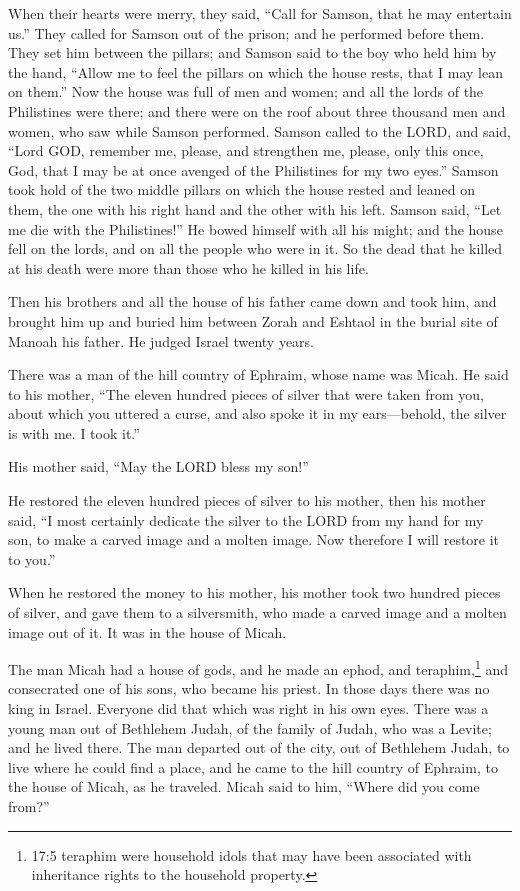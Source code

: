 \myverse{}When their hearts were merry, they said, “Call for Samson, that
he may entertain us.” They called for Samson out of the prison; and he performed before them. They set
him between the pillars;
\myverse{}and Samson said to the boy who held him by the hand, “Allow me to feel the
pillars on which the house rests, that I may lean on them.”
\myverse{}Now the house was full of men and women; and all the lords of the Philistines
were there; and there were on the roof about three thousand men and women, who saw while Samson performed.
\myverse{}Samson called to the LORD, and said, “Lord GOD, remember me, please, and
strengthen me, please, only this once, God, that I may be at once avenged of the Philistines for my two
eyes.”
\myverse{}Samson took hold of the two middle pillars on which the house rested and
leaned on them, the one with his right hand and the other with his left.
\myverse{}Samson said, “Let me die with the Philistines!” He bowed himself with all
his might; and the house fell on the lords, and on all the people who were in it. So the dead that he
killed at his death were more than those who he killed in his life.

\myverse{}Then his brothers and all the house of his father came down
and took him, and brought him up and buried him between Zorah and Eshtaol in the burial site of Manoah
his father. He judged Israel twenty years.


\mychapter{} \myverse*{}There was a man of the hill country of Ephraim, whose name was
Micah.
\myverse{}He said to his mother, “The eleven hundred pieces of silver that were taken
from you, about which you uttered a curse, and also spoke it in my ears—behold, the silver is with me.
I took it.”

His mother said, “May the LORD bless my son!”

\myverse{}He restored the eleven hundred pieces of silver to his mother,
then his mother said, “I most certainly dedicate the silver to the LORD from my hand for my son, to make
a carved image and a molten image. Now therefore I will restore it to you.”

\myverse{}When he restored the money to his mother, his mother took two
hundred pieces of silver, and gave them to a silversmith, who made a carved image and a molten image out
of it. It was in the house of Micah.

\myverse{}The man Micah had a house of gods, and he made an ephod, and teraphim,\footnote{17:5 teraphim were household idols that may have been associated with inheritance rights to the household
	property.} and consecrated one of his sons, who became his priest.
\myverse{}In those days there was no king in Israel. Everyone did that which was right
in his own eyes.
\myverse{}There was a young man out of Bethlehem Judah, of the family of Judah, who was
a Levite; and he lived there.
\myverse{}The man departed out of the city, out of Bethlehem Judah, to live where he
could find a place, and he came to the hill country of Ephraim, to the house of Micah, as he traveled.
\myverse{}Micah said to him, “Where did you come from?”

